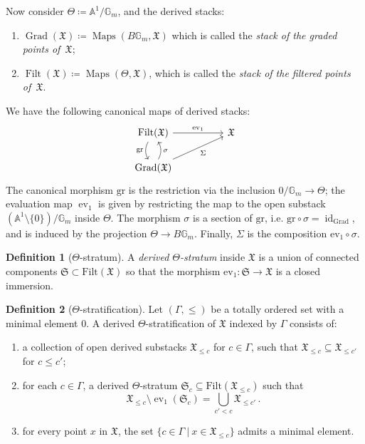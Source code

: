 \documentclass[12pt]{amsart}
\theoremstyle{definition}
\newtheorem{definition}{Definition}[section]
\newcommand{\BG}{{\mathbb{G}}}
\newcommand{\1}{\mathbf 1}
\newcommand{\FX}{{\mathfrak{X}}}
\newcommand{\FS}{{\mathfrak{S}}}
\DeclareMathOperator{\id}{id}
\newcommand{\gr}{\mathrm{gr}}
\renewcommand{\ev}{\mathrm{ev}}
\newcommand{\Grad}{\mathrm{Grad}}
\newcommand{\Filt}{\mathrm{Filt}}
\begin{document}
Now consider $\Theta\coloneqq \mathbb A^1/\mathbb G_m$, and the derived stacks:

\begin{enumerate}
    \item[i)] $\operatorname{Grad}(\mathfrak X) \coloneqq  \operatorname{Maps}(B\mathbb G_m, \FX)$ which is called the \textit{stack of the graded points of~$\mathfrak X$};
\item[ii)] $\operatorname{Filt}(\mathfrak X) \coloneqq \operatorname{Maps}(\Theta, \mathfrak X)$, which is called the \textit{stack of the filtered points of~$\mathfrak X$}.
\end{enumerate} 

We have the following canonical maps of derived stacks:
\begin{equation}\label{eq: filtgraddiagram}
    \begin{tikzcd}
       \Filt(\FX)\arrow[rr,"\ev_1"]\arrow[d, "\gr"', bend right] & & \FX\\
        \Grad(\FX)\arrow[u, "\sigma"', bend right]\arrow[urr, "\Sigma"']&
    \end{tikzcd}
\end{equation}
The canonical morphism $\gr$ is the restriction via the inclusion $0/\mathbb G_m \to \Theta$; the evaluation map $\operatorname{ev}_1$ is given by restricting the map to the open substack $(\mathbb A^1 \setminus \{0\})/\BG_m$ inside $\Theta.$ The morphism $\sigma$ is a section of $\gr$, i.e. $\gr\circ \sigma=\id_\Grad$, and is induced by the projection $\Theta\to B\BG_m$. Finally, $\Sigma$ is the composition $\ev_1\circ \sigma$.

\begin{definition}[$\Theta$-stratum] A \textit{derived $\Theta$-stratum} inside $\mathfrak X$ is a union of connected components $\mathfrak S \subset \Filt(\FX)$ so that the morphism $\ev_1: \mathfrak S \to \mathfrak X$ is a closed immersion.
\end{definition}

\begin{definition}[$\Theta$-stratification] Let $(\Gamma, \leq)$ be a totally ordered set with a minimal element $0$. A derived $\Theta$-stratification of $\FX$ indexed by $\Gamma$ consists of:
\begin{enumerate}
    \item a collection of open derived substacks $\FX_{\leq c}$ for $c \in \Gamma$, such that $\mathfrak X_{\leq c} \subseteq \FX_{\leq c'}$ for $c \leq  c'$;
\item  for each $c\in \Gamma$, a derived $\Theta$-stratum $\FS_c\subseteq \Filt(\mathfrak \FX_{\leq c})$ such that 
\[\mathfrak X_{\leq c} \setminus \operatorname{ev}_1(\mathfrak S_c) = \bigcup \limits_{c'<c} \mathfrak X_{\leq c'}\,.\]
\item for every point $x$ in $\mathfrak X$, the set $\{c \in \Gamma \ | \ x \in \FX_{\leq c}\}$ admits a minimal element.
\end{enumerate}
\end{definition}
\end{document}
